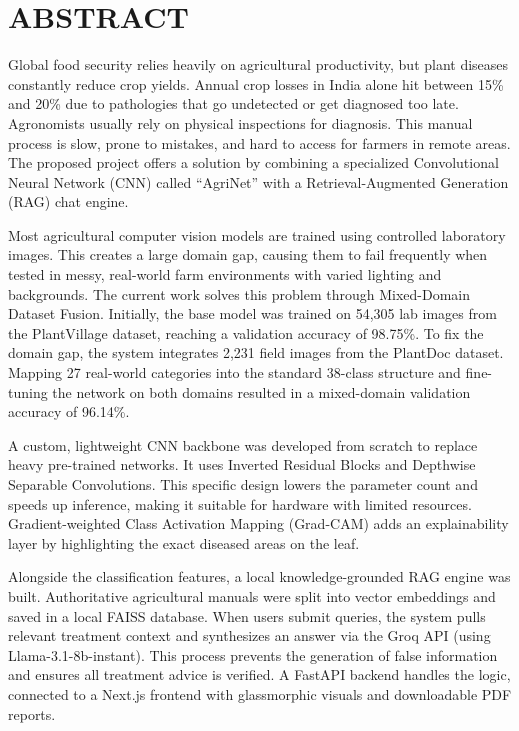 \documentclass[12pt, a4paper]{report}
\begin{document}
\chapter*{ABSTRACT}

Global food security relies heavily on agricultural productivity, but plant diseases constantly reduce crop yields. Annual crop losses in India alone hit between 15\% and 20\% due to pathologies that go undetected or get diagnosed too late. Agronomists usually rely on physical inspections for diagnosis. This manual process is slow, prone to mistakes, and hard to access for farmers in remote areas. The proposed project offers a solution by combining a specialized Convolutional Neural Network (CNN) called ``AgriNet'' with a Retrieval-Augmented Generation (RAG) chat engine.

Most agricultural computer vision models are trained using controlled laboratory images. This creates a large domain gap, causing them to fail frequently when tested in messy, real-world farm environments with varied lighting and backgrounds. The current work solves this problem through Mixed-Domain Dataset Fusion. Initially, the base model was trained on 54,305 lab images from the PlantVillage dataset, reaching a validation accuracy of 98.75\%. To fix the domain gap, the system integrates 2,231 field images from the PlantDoc dataset. Mapping 27 real-world categories into the standard 38-class structure and fine-tuning the network on both domains resulted in a mixed-domain validation accuracy of 96.14\%.

A custom, lightweight CNN backbone was developed from scratch to replace heavy pre-trained networks. It uses Inverted Residual Blocks and Depthwise Separable Convolutions. This specific design lowers the parameter count and speeds up inference, making it suitable for hardware with limited resources. Gradient-weighted Class Activation Mapping (Grad-CAM) adds an explainability layer by highlighting the exact diseased areas on the leaf.

Alongside the classification features, a local knowledge-grounded RAG engine was built. Authoritative agricultural manuals were split into vector embeddings and saved in a local FAISS database. When users submit queries, the system pulls relevant treatment context and synthesizes an answer via the Groq API (using Llama-3.1-8b-instant). This process prevents the generation of false information and ensures all treatment advice is verified. A FastAPI backend handles the logic, connected to a Next.js frontend with glassmorphic visuals and downloadable PDF reports.
\end{document}
